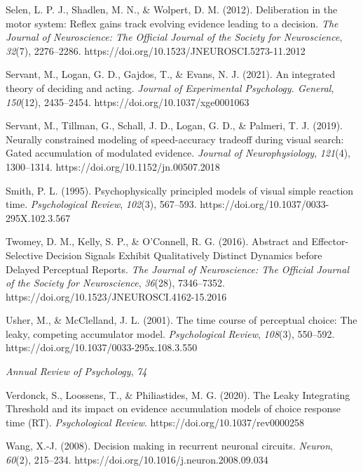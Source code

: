 \begin{references}
Selen, L. P. J., Shadlen, M. N., \& Wolpert, D. M. (2012). Deliberation in the motor system: Reflex gains track evolving evidence leading to a decision. \emph{The Journal of Neuroscience: The Official Journal of the Society for Neuroscience}, \emph{32}(7), 2276--2286. https://doi.org/10.1523/JNEUROSCI.5273-11.2012

Servant, M., Logan, G. D., Gajdos, T., \& Evans, N. J. (2021). An integrated theory of deciding and acting. \emph{Journal of Experimental Psychology. General}, \emph{150}(12), 2435--2454. https://doi.org/10.1037/xge0001063

Servant, M., Tillman, G., Schall, J. D., Logan, G. D., \& Palmeri, T. J. (2019). Neurally constrained modeling of speed-accuracy tradeoff during visual search: Gated accumulation of modulated evidence. \emph{Journal of Neurophysiology}, \emph{121}(4), 1300--1314. https://doi.org/10.1152/jn.00507.2018

Smith, P. L. (1995). Psychophysically principled models of visual simple reaction time. \emph{Psychological Review}, \emph{102}(3), 567--593. https://doi.org/10.1037/0033-295X.102.3.567

Twomey, D. M., Kelly, S. P., \& O'Connell, R. G. (2016). Abstract and Effector-Selective Decision Signals Exhibit Qualitatively Distinct Dynamics before Delayed Perceptual Reports. \emph{The Journal of Neuroscience: The Official Journal of the Society for Neuroscience}, \emph{36}(28), 7346--7352. https://doi.org/10.1523/JNEUROSCI.4162-15.2016

Usher, M., \& McClelland, J. L. (2001). The time course of perceptual choice: The leaky, competing accumulator model. \emph{Psychological Review}, \emph{108}(3), 550--592. https://doi.org/10.1037/0033-295x.108.3.550

 \emph{Annual Review of Psychology}, \emph{74}

 \del{,} 

Verdonck, S., Loossens, T., \& Philiastides, M. G. (2020). The Leaky Integrating Threshold and its impact on evidence accumulation models of choice response time (RT). \emph{Psychological Review}. https://doi.org/10.1037/rev0000258

Wang, X.-J. (2008). Decision making in recurrent neuronal circuits. \emph{Neuron}, \emph{60}(2), 215--234. https://doi.org/10.1016/j.neuron.2008.09.034

\end{references}
